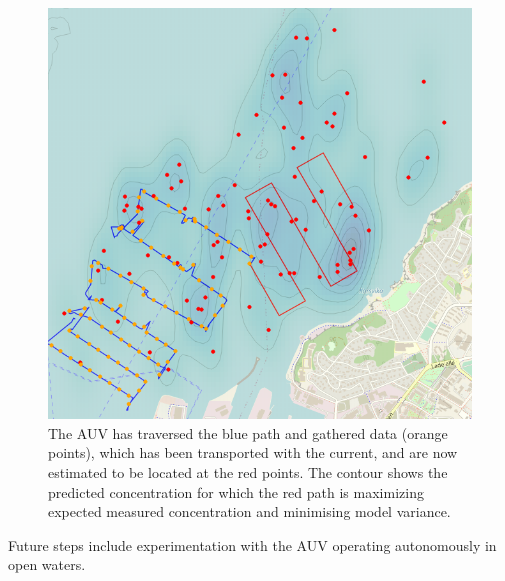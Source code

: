 \documentclass[conference]{IEEEtran}
\begin{document}
\begin{figure}[tbp]
  \centering
  \includegraphics[width=\linewidth]{figures/munkholmen_planned_path.png}
  \caption{The AUV has traversed the blue path and gathered data (orange
    points), which has been transported with the current, and are now
    estimated to be located at the red points.  The contour shows the
    predicted concentration for which the red path is maximizing
    expected measured concentration and minimising model variance.}
  \label{fig:munkholmen}
\end{figure}

Future steps include experimentation with the AUV operating
autonomously in open waters.


% 
% 
\end{document}
